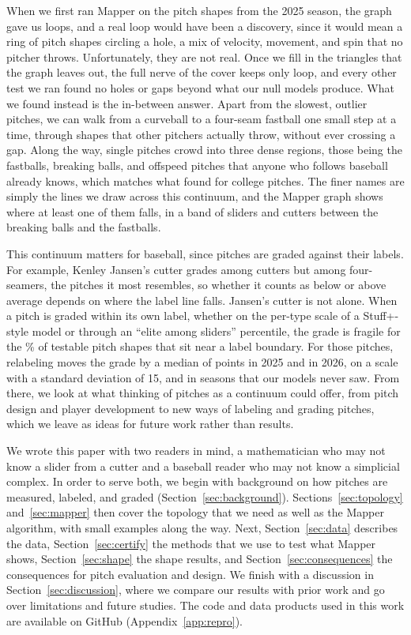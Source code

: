 \documentclass[11pt]{article}
\theoremstyle{definition}
\theoremstyle{remark}
\begin{document}
When we first ran Mapper on the \NShapes{} pitch shapes from the 2025 season, the graph gave us \GraphBone{} loops, and a real loop would have been a discovery, since it would mean a ring of pitch shapes circling a hole, a mix of velocity, movement, and spin that no pitcher throws.
Unfortunately, they are not real.
Once we fill in the triangles that the graph leaves out, the full nerve of the cover keeps only \NerveBone{} loop, and every other test we ran found no holes or gaps beyond what our null models produce.
What we found instead is the in-between answer.
Apart from the slowest, outlier pitches, we can walk from a curveball to a four-seam fastball one small step at a time, through shapes that other pitchers actually throw, without ever crossing a gap.
Along the way, single pitches crowd into three dense regions, those being the fastballs, breaking balls, and offspeed pitches that anyone who follows baseball already knows, which matches what \textcite{maloof2026classify} found for college pitches.
The finer names are simply the lines we draw across this continuum, and the Mapper graph shows where at least one of them falls, in a band of sliders and cutters between the breaking balls and the fastballs.

This continuum matters for baseball, since pitches are graded against their labels.
For example, Kenley Jansen's cutter grades \JansenOwnGrade{} among cutters but \JansenAltGrade{} among four-seamers, the pitches it most resembles, so whether it counts as below or above average depends on where the label line falls.
Jansen's cutter is not alone.
When a pitch is graded within its own label, whether on the per-type scale of a Stuff+-style model or through an ``elite among sliders'' percentile, the grade is fragile for the \LSTwentyFiveBoundaryPct\% of testable pitch shapes that sit near a label boundary.
For those pitches, relabeling moves the grade by a median of \LSTwentyFiveShift{} points in 2025 and \LSTwentySixShift{} in 2026, on a scale with a standard deviation of 15, and in seasons that our models never saw.
From there, we look at what thinking of pitches as a continuum could offer, from pitch design and player development to new ways of labeling and grading pitches, which we leave as ideas for future work rather than results.

We wrote this paper with two readers in mind, a mathematician who may not know a slider from a cutter and a baseball reader who may not know a simplicial complex.
In order to serve both, we begin with background on how pitches are measured, labeled, and graded (Section~\ref{sec:background}).
Sections~\ref{sec:topology} and~\ref{sec:mapper} then cover the topology that we need as well as the Mapper algorithm, with small examples along the way.
Next, Section~\ref{sec:data} describes the data, Section~\ref{sec:certify} the methods that we use to test what Mapper shows, Section~\ref{sec:shape} the shape results, and Section~\ref{sec:consequences} the consequences for pitch evaluation and design.
We finish with a discussion in Section~\ref{sec:discussion}, where we compare our results with prior work and go over limitations and future studies.
The code and data products used in this work are available on GitHub (Appendix~\ref{app:repro}).
\end{document}
